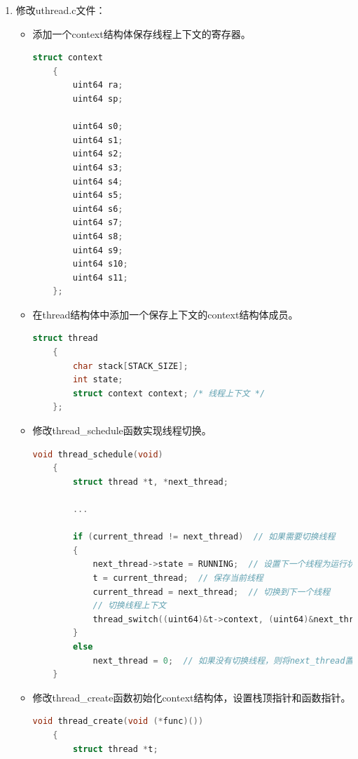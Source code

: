 \begin{enumerate}
    \item 修改uthread.c文件：
          \begin{itemize}
              \item 添加一个context结构体保存线程上下文的寄存器。
                    \begin{lstlisting}[language=c,title=context结构体]
    struct context
    {
        uint64 ra;
        uint64 sp;

        uint64 s0;
        uint64 s1;
        uint64 s2;
        uint64 s3;
        uint64 s4;
        uint64 s5;
        uint64 s6;
        uint64 s7;
        uint64 s8;
        uint64 s9;
        uint64 s10;
        uint64 s11;
    };
    \end{lstlisting}
              \item 在thread结构体中添加一个保存上下文的context结构体成员。
                    \begin{lstlisting}[language=c,title=对thread结构体的修改]
    struct thread
    {
        char stack[STACK_SIZE]; 
        int state;              
        struct context context; /* 线程上下文 */
    };
        \end{lstlisting}

              \item 修改thread\_schedule函数实现线程切换。
                    \begin{lstlisting}[language=c,title=对thread\_schedule函数的修改]
    void thread_schedule(void)
    {
        struct thread *t, *next_thread;
    
        ...
    
        if (current_thread != next_thread)  // 如果需要切换线程
        {
            next_thread->state = RUNNING;  // 设置下一个线程为运行状态
            t = current_thread;  // 保存当前线程
            current_thread = next_thread;  // 切换到下一个线程
            // 切换线程上下文
            thread_switch((uint64)&t->context, (uint64)&next_thread->context);  
        }
        else
            next_thread = 0;  // 如果没有切换线程，则将next_thread置为0
    }            
              \end{lstlisting}
              \item 修改thread\_create函数初始化context结构体，设置栈顶指针和函数指针。
                    \begin{lstlisting}[language=c,title=对thread\_create函数的修改]
    void thread_create(void (*func)())
    {
        struct thread *t;


\end{lstlisting}
\end{itemize}
\end{enumerate}

